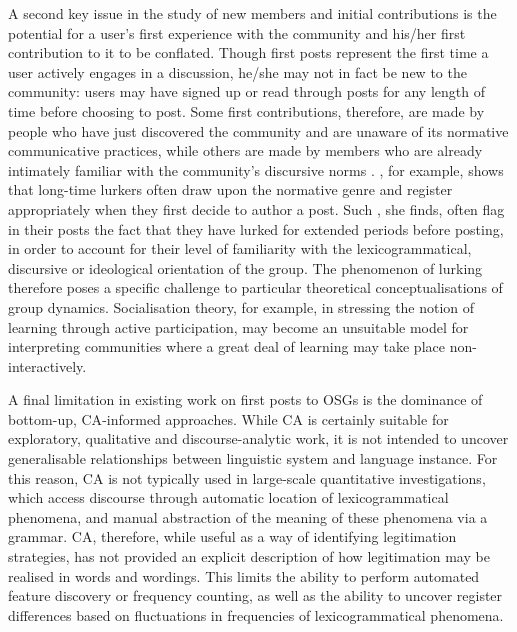 A second key issue in the study of new \glspl{member} and initial contributions is the potential for a user's first experience with the community and his\slash her first contribution to it to be conflated. Though first \glspl{post} represent the first time a user actively engages in a discussion, he\slash she may not in fact be new to the community: users may have signed up or read through \glspl{post} for any length of time before choosing to post. Some first contributions, therefore, are made by people who have just discovered the community and are unaware of its normative communicative practices, while others are made by \glspl{member} who are already intimately familiar with the community's discursive norms \cite{dennen_pedagogical_2008,han_social_2012,preece_top_2004,smithson_membership_2011}. \textcite{weber_missed_2011}, for example, shows that long\hyp{}time lurkers often draw upon the normative genre and register appropriately when they first decide to author a \gls{post}. Such , she finds, often flag in their \glspl{post} the fact that they have lurked for extended periods before posting, in order to account for their level of familiarity with the lexicogrammatical, discursive or ideological orientation of the group. The phenomenon of lurking therefore poses a specific challenge to particular theoretical conceptualisations of group dynamics. Socialisation theory, for example, in stressing the notion of learning through active participation, may become an unsuitable model for interpreting communities where a great deal of learning may take place non\hyp{}interactively.

A final limitation in existing work on first posts to \glspl{OSG} is the dominance of bottom\hyp{}up, \gls{CA}\hyp{}informed approaches. While \gls{CA} is certainly suitable for exploratory, qualitative and discourse\hyp{}analytic work, it is not intended to uncover generalisable relationships between linguistic system and language instance. For this reason, \gls{CA} is not typically used in large\hyp{}scale quantitative investigations, which access discourse through automatic location of lexicogrammatical phenomena, and manual abstraction of the meaning of these phenomena via a grammar. \gls{CA}, therefore, while useful as a way of identifying legitimation strategies, has not provided an explicit description of how legitimation may be realised in words and wordings. This limits the ability to perform automated feature discovery or frequency counting, as well as the ability to uncover register differences based on fluctuations in frequencies of lexicogrammatical phenomena.

